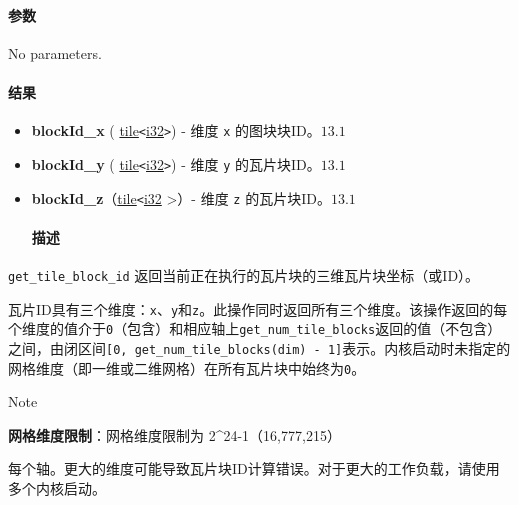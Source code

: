 \documentclass{article}
\begin{document}
\paragraph{参数}

No parameters.



\paragraph{结果}

\begin{itemize}
\item \textbf{blockId\_x} ( \href{https://docs.nvidia.com/cuda/tile-ir/latest/sections/types.html#type-tile}{tile}\texttt{<}\href{https://docs.nvidia.com/cuda/tile-ir/latest/sections/types.html#subsection-element-types}{i32}\texttt{>}) - 维度 \texttt{x} 的图块块ID。$\boxed{13.1}$
\item \textbf{blockId\_y} ( \href{https://docs.nvidia.com/cuda/tile-ir/latest/sections/types.html#type-tile}{tile}\texttt{<}\href{https://docs.nvidia.com/cuda/tile-ir/latest/sections/types.html#subsection-element-types}{i32}\texttt{>}) - 维度 \texttt{y} 的瓦片块ID。$\boxed{13.1}$
\item \textbf{blockId\_z}（\href{https://docs.nvidia.com/cuda/tile-ir/latest/sections/types.html#type-tile}{tile}\texttt{<}\href{https://docs.nvidia.com/cuda/tile-ir/latest/sections/types.html#subsection-element-types}{i32} >）- 维度 \texttt{z} 的瓦片块ID。$\boxed{13.1}$


\paragraph{描述}

\end{itemize}
\texttt{get\_tile\_block\_id} 返回当前正在执行的瓦片块的三维瓦片块坐标（或ID）。


瓦片ID具有三个维度：\texttt{x}、\texttt{y}和\texttt{z}。此操作同时返回所有三个维度。该操作返回的每个维度的值介于\texttt{0}（包含）和相应轴上\texttt{get\_num\_tile\_blocks}返回的值（不包含）之间，由闭区间\texttt{[0, get\_num\_tile\_blocks(dim) - 1]}表示。内核启动时未指定的网格维度（即一维或二维网格）在所有瓦片块中始终为\texttt{0}。


Note


\textbf{网格维度限制}：网格维度限制为 2\textasciicircum{}24-1（16,777,215）

每个轴。更大的维度可能导致瓦片块ID计算错误。对于更大的工作负载，请使用多个内核启动。
\end{document}
